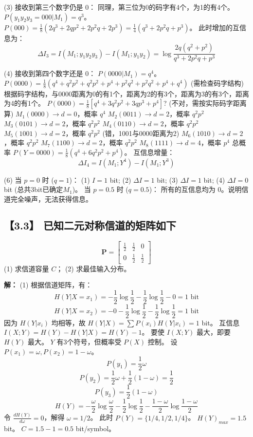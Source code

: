 \documentclass[11pt, a4paper]{article}
\begin{document}
(3) 接收到第三个数字仍是 0：
同理，第三位为0的码字有4个，为1的有4个。
$P(y_1 y_2 y_3 = 000 | M_1) = q^3$。
$P(000) = \frac{1}{8}(2q^3 + 2q p^2 + 2p^2 q + 2p^3) = \frac{1}{4}(q^3 + 2p^2q + p^3)$。
此时增加的互信息为：
\[ \Delta I_3 = I(M_1; y_1y_2y_3) - I(M_1; y_1y_2) = \log \frac{2q(q^2+p^2)}{q^3+2p^2q+p^3} \]

(4) 接收到第四个数字还是 0：
$P(0000|M_1) = q^4$。
$P(0000) = \frac{1}{8}(q^4 + q^2p^2 + q^2p^2 + p^4 + p^2q^2 + p^2q^2 + p^4 + q^4)$ (需检查码字结构)
根据码字结构，与0000距离为0的有1个，距离为2的有3个，距离为3的有3个，距离为4的有1个。
$P(0000) = \frac{1}{8}[q^4 + 3q^2p^2 + 3qp^3 + p^4]$? (不对，需按实际码字距离算)
$M_1(0000) \to d=0$，概率 $q^4$
$M_2(0011) \to d=2$，概率 $q^2p^2$
$M_3(0101) \to d=2$，概率 $q^2p^2$
$M_4(0110) \to d=2$，概率 $q^2p^2$
$M_5(1001) \to d=2$，概率 $q^2p^2$ (错，1001与0000距离为2)
$M_6(1010) \to d=2$，概率 $q^2p^2$
$M_7(1100) \to d=2$，概率 $q^2p^2$
$M_8(1111) \to d=4$，概率 $p^4$
总概率 $P(Y=0000) = \frac{1}{8}(q^4 + 6q^2p^2 + p^4)$。
互信息增量：
\[ \Delta I_4 = I(M_1; Y^4) - I(M_1; Y^3) \]

(6) 
当 $p=0$ 时 ($q=1$)：
(1) $I = 1$ bit; (2) $\Delta I = 1$ bit; (3) $\Delta I = 1$ bit; (4) $\Delta I = 0$ bit (总共3bit已确定$M_1$)。
当 $p=0.5$ 时 ($q=0.5$)：
所有的互信息均为 0。说明信道完全噪声，无法获得信息。

\subsection*{【3.3】 已知二元对称信道的矩阵如下}
\[
\mathbf{P} = \begin{bmatrix}
\frac{1}{2} & \frac{1}{2} & 0 \\
0 & \frac{1}{2} & \frac{1}{2}
\end{bmatrix}
\]
(1) 求信道容量 $C$；
(2) 求最佳输入分布。

\textbf{解：}
(1) 根据信道矩阵，有：
\[ H(Y|X=x_1) = -\frac{1}{2}\log\frac{1}{2} - \frac{1}{2}\log\frac{1}{2} - 0 = 1 \text{ bit} \]
\[ H(Y|X=x_2) = -0 - \frac{1}{2}\log\frac{1}{2} - \frac{1}{2}\log\frac{1}{2} = 1 \text{ bit} \]
因为 $H(Y|x_i)$ 均相等，故 $H(Y|X) = \sum P(x_i)H(Y|x_i) = 1$ bit。
互信息 $I(X;Y) = H(Y) - H(Y|X) = H(Y) - 1$。
要使 $I(X;Y)$ 最大，即要 $H(Y)$ 最大。
$Y$ 有3个符号，但概率受 $P(X)$ 控制。
设 $P(x_1) = \omega, P(x_2) = 1-\omega$。
\[ P(y_1) = \frac{1}{2}\omega \]
\[ P(y_2) = \frac{1}{2}\omega + \frac{1}{2}(1-\omega) = \frac{1}{2} \]
\[ P(y_3) = \frac{1}{2}(1-\omega) \]
\[ H(Y) = -\frac{\omega}{2}\log\frac{\omega}{2} - \frac{1}{2}\log\frac{1}{2} - \frac{1-\omega}{2}\log\frac{1-\omega}{2} \]
令 $\frac{dH(Y)}{d\omega} = 0$，解得 $\omega = 1/2$。
此时 $P(Y) = \{1/4, 1/2, 1/4\}$。
$H(Y)_{max} = 1.5$ bit。
$C = 1.5 - 1 = 0.5$ bit/symbol。
\end{document}
